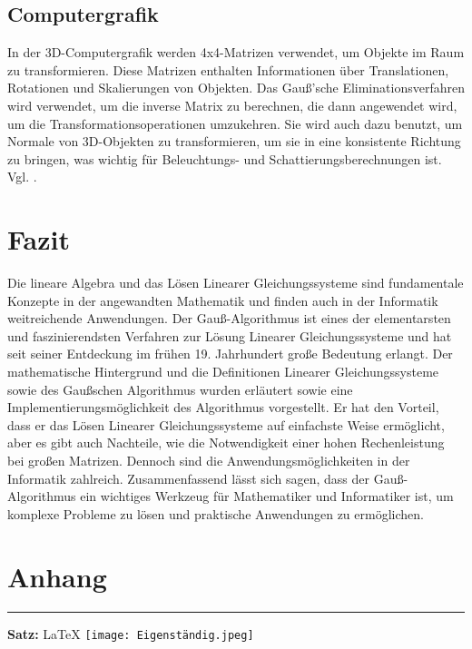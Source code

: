 \documentclass[a4paper, 12pt]{report}
\newcommand{\GA}{Gauß-Algorithmus }
\begin{document}
\section{Computergrafik}
In der 3D-Computergrafik werden 4x4-Matrizen verwendet, um Objekte im Raum zu transformieren.
Diese Matrizen enthalten Informationen über Translationen, Rotationen und Skalierungen von Objekten.
Das Gauß'sche Eliminationsverfahren wird verwendet, um die inverse Matrix zu berechnen, die dann angewendet wird,
um die Transformationsoperationen umzukehren. Sie wird auch dazu benutzt, um Normale von 3D-Objekten zu transformieren,
um sie in eine konsistente Richtung zu bringen, was wichtig für Beleuchtungs- und Schattierungsberechnungen ist. Vgl. \cite{6}.

{\let\clearpage\relax \chapter{Fazit}}
Die lineare Algebra und das Lösen Linearer Gleichungssysteme sind fundamentale Konzepte in der angewandten Mathematik
und finden auch in der Informatik weitreichende Anwendungen. Der \GA  ist eines der elementarsten und faszinierendsten Verfahren
zur Lösung Linearer Gleichungssysteme und hat seit seiner Entdeckung im frühen 19. Jahrhundert große Bedeutung erlangt.
Der mathematische Hintergrund und die Definitionen Linearer Gleichungssysteme sowie des Gaußschen Algorithmus wurden
erläutert sowie eine Implementierungsmöglichkeit des Algorithmus vorgestellt.
Er hat den Vorteil, dass er das Lösen Linearer Gleichungssysteme auf einfachste Weise ermöglicht,
aber es gibt auch Nachteile, wie die Notwendigkeit einer hohen Rechenleistung bei großen Matrizen.
Dennoch sind die Anwendungsmöglichkeiten in der Informatik zahlreich.
Zusammenfassend lässt sich sagen, dass der \GA  ein wichtiges Werkzeug für
Mathematiker und Informatiker ist, um komplexe Probleme zu lösen und praktische Anwendungen zu ermöglichen.


{\let\clearpage\relax\chapter*{Anhang}}
\footnotesize

\printbibliography
\vspace*{\fill}
\vspace*{5pt}
\hrule
\vspace{5pt}
    \textbf{Satz:}
    \LaTeX
\newpage
\texttt{[image: Eigenständig.jpeg]}
\end{document}
